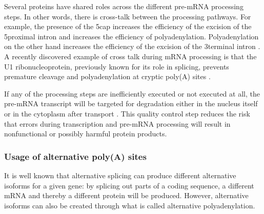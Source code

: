 Several proteins have shared roles across the different pre-mRNA processing
steps. In other words, there is cross-talk between the processing pathways. For
example, the presence of the 5\ppp cap increases the efficiency of the excision
of the 5\ppp proximal intron and increases the efficiency of polyadenylation.
Polyadenylation on the other hand increases the efficiency of the excision of
the 3\ppp terminal intron \cite{proudfoot_integrating_2002}. A recently
discovered example of cross talk during mRNA processing is that the U1
ribonucleoprotein, previously known for its role in splicing, prevents
premature cleavage and polyadenylation at cryptic poly(A) sites
\cite{kaida_u1_2010}.

If any of the processing steps are inefficiently executed or not executed at
all, the pre-mRNA transcript will be targeted for degradation either in the
nucleus itself or in the cytoplasm after transport \cite{doma_rna_2007}. This
quality control step reduces the risk that errors during transcription and
pre-mRNA processing will result in nonfunctional or possibly harmful protein
products.

\subsubsection{Usage of alternative poly(A) sites}
It is well known that alternative splicing can produce different alternative
isoforms for a given gene: by splicing out parts of a coding sequence, a
different mRNA and thereby a different protein will be produced. However,
alternative isoforms can also be created through what is called alternative
polyadenylation.

